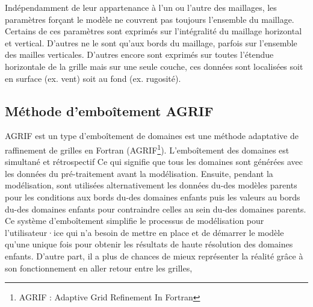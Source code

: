 \documentclass[10pt,a4paper,titlepage]{article}
\begin{document}
Indépendamment de leur appartenance à l'un ou l'autre des maillages, les paramètres forçant le modèle ne couvrent pas toujours l'ensemble du maillage.
Certains de ces paramètres sont exprimés sur l'intégralité du maillage horizontal et vertical.
D'autres ne le sont qu'aux bords du maillage, parfois sur l'ensemble des mailles verticales.
D'autres encore sont exprimés sur toutes l'étendue horizontale de la grille mais sur une seule couche, ces données sont localisées soit en surface (ex. vent) soit au fond (ex. rugosité).

\subsection{Méthode d'emboîtement AGRIF}
\label{anx:AGRIF}
AGRIF est un type d'emboîtement de domaines est une méthode adaptative de raffinement de grilles en Fortran (AGRIF\footnote{AGRIF : Adaptive Grid Refinement In Fortran}).
L'emboîtement des domaines est simultané et rétrospectif
Ce qui signifie que tous les domaines sont générées avec les données du pré-traitement avant la modélisation.
Ensuite, pendant la modélisation, sont utilisées alternativement les données du-des modèles parents pour les conditions aux bords du-des domaines enfants puis les valeurs au bords du-des domaines enfants pour contraindre celles au sein du-des domaines parents.
Ce système d'emboîtement simplifie le processus de modélisation pour l'utilisateur·ice qui n'a besoin de mettre en place et de démarrer le modèle qu'une unique fois pour obtenir les résultats de haute résolution des domaines enfants.
D'autre part, il a plus de chances de mieux représenter la réalité grâce à son fonctionnement en aller retour entre les grilles,
\end{document}
